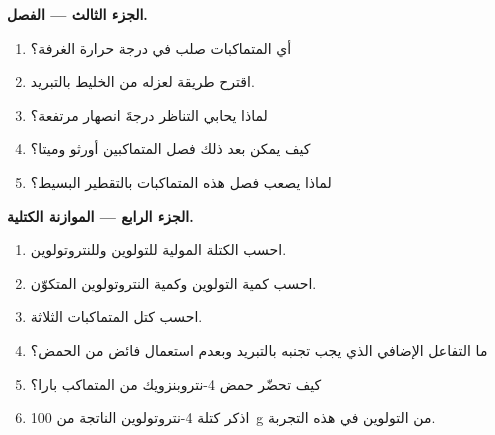 \begin{problem}
\medskip
\noindent\textbf{الجزء الثالث --- الفصل.}
\begin{enumerate}[resume]
  \item أي المتماكبات صلب في درجة حرارة الغرفة؟
  \item اقترح طريقة لعزله من الخليط بالتبريد.
  \item لماذا يحابي التناظر درجةَ انصهار مرتفعة؟
  \item كيف يمكن بعد ذلك فصل المتماكبين أورثو وميتا؟
  \item لماذا يصعب فصل هذه المتماكبات بالتقطير البسيط؟
\end{enumerate}

\medskip
\noindent\textbf{الجزء الرابع --- الموازنة الكتلية.}
\begin{enumerate}[resume]
  \item احسب الكتلة المولية للتولوين وللنتروتولوين.
  \item احسب كمية التولوين وكمية النتروتولوين المتكوّن.
  \item احسب كتل المتماكبات الثلاثة.
  \item ما التفاعل الإضافي الذي يجب تجنبه بالتبريد وبعدم استعمال فائض من الحمض؟
  \item كيف تحضّر حمض 4-نتروبنزويك من المتماكب بارا؟
  \item اذكر كتلة 4-نتروتولوين الناتجة من \qty{100}{g} من التولوين في هذه التجربة.
\end{enumerate}
\end{problem}

